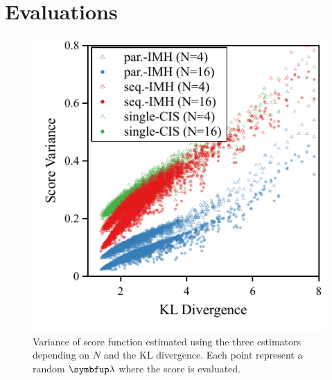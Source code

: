 

\vspace{-0.05in}
\section{Evaluations}\label{section:eval}

\begin{figure}[t]
\centering
\includegraphics[scale=0.7]{figures/simulation_02.pdf}
\caption{Variance of score function estimated using the three estimators depending on \(N\) and the KL divergence.
Each point represent a random \(\vlambda\) where the score is evaluated.}\label{fig:simulation}
\end{figure}
%
